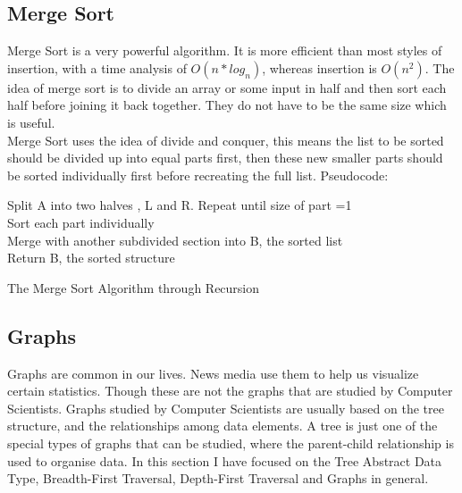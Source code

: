 \documentclass[10pt,twocolumn]{IEEEtran}
\begin{document}
\subsection{Merge Sort}
Merge Sort is a very powerful algorithm. It is more efficient than most styles of insertion, with a time analysis of $O(n * log_{n})$, whereas insertion is $O(n^2)$. The idea of merge sort is to divide an array or some input in half and then sort each half before joining it back together. They do not have to be the same size which is useful.  \\
Merge Sort uses the idea of divide and conquer, this means the list to be sorted should be divided up into equal parts first, then these new smaller parts should be sorted individually first before recreating the full list.
Pseudocode:
\IncMargin{1em}
\begin{algorithm}
	\SetAlgoLined
  	{Split A into two halves , L and R. Repeat until size of part =1\\
  	Sort each part individually \\
  	Merge with another subdivided section into B, the sorted list\\ 
  	Return B, the sorted structure}
\caption{The Merge Sort Algorithm through Recursion}
\end{algorithm}\DecMargin{1em}

\subsection{Graphs}
Graphs are common in our lives. News media use them to help us visualize certain statistics. Though these are not the graphs that are studied by Computer Scientists. Graphs studied by Computer Scientists are usually based on the tree structure, and the relationships among data elements. A tree is just one of the special types of graphs that can be studied, where the parent-child relationship is used to organise data. In this section I have focused on the Tree Abstract Data Type, Breadth-First Traversal, Depth-First Traversal and Graphs in general. \\
\end{document}
